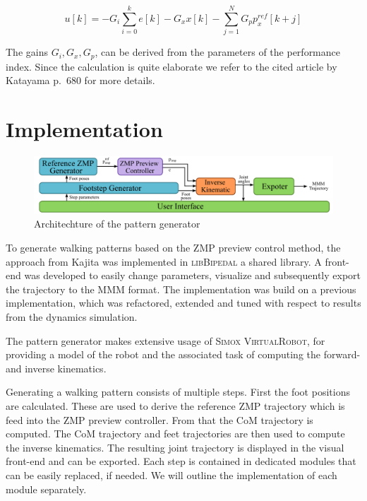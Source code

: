 \documentclass[english,ngerman]{KITreprt}
\newcommand{\name}[1]{\textsc{#1}}
\begin{document}
\begin{equation}
u[k] = -G_i \sum^k_{i=0} e[k] - G_x x[k] - \sum^N_{j=1} G_p p^{ref}_x[k + j]
\end{equation}

The gains $G_i, G_x, G_p$, can be derived from the parameters of the
performance index. Since the calculation is quite elaborate we refer to
the cited article by Katayama p.~680 for more details.

\section{Implementation}\label{implementation}

\begin{figure}[tb]
\vspace*{-1em}
\includegraphics[width=\textwidth]{images/pattern_generator_architechture.png}
\caption{Architechture of the pattern generator}
\label{img:pattern-generator-architechture}
\end{figure}

To generate walking patterns based on the ZMP preview control method,
the approach from Kajita was implemented in \name{libBipedal} a shared
library. A front-end was developed to easily change parameters,
visualize and subsequently export the trajectory to the \name{MMM}
format. The implementation was build on a previous implementation, which
was refactored, extended and tuned with respect to results from the
dynamics simulation.

The pattern generator makes extensive usage of
\name{Simox VirtualRobot}, for providing a model of the robot and the
associated task of computing the forward- and inverse kinematics.

Generating a walking pattern consists of multiple steps. First the foot
positions are calculated. These are used to derive the reference ZMP
trajectory which is feed into the ZMP preview controller. From that the
CoM trajectory is computed. The CoM trajectory and feet trajectories are
then used to compute the inverse kinematics. The resulting joint
trajectory is displayed in the visual front-end and can be exported.
Each step is contained in dedicated modules that can be easily replaced,
if needed. We will outline the implementation of each module separately.
\end{document}
